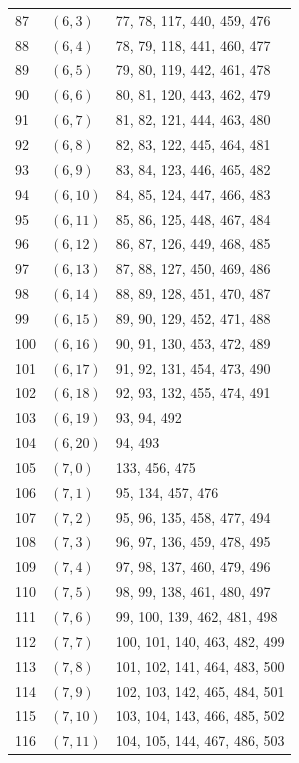 \documentclass{article}
\begin{document}
\begin{longtable}{lll}
  87 & \((6, 3)\) & 77, 78, 117, 440, 459, 476 \\
  88 & \((6, 4)\) & 78, 79, 118, 441, 460, 477 \\
  89 & \((6, 5)\) & 79, 80, 119, 442, 461, 478 \\
  90 & \((6, 6)\) & 80, 81, 120, 443, 462, 479 \\
  91 & \((6, 7)\) & 81, 82, 121, 444, 463, 480 \\
  92 & \((6, 8)\) & 82, 83, 122, 445, 464, 481 \\
  93 & \((6, 9)\) & 83, 84, 123, 446, 465, 482 \\
  94 & \((6, 10)\) & 84, 85, 124, 447, 466, 483 \\
  95 & \((6, 11)\) & 85, 86, 125, 448, 467, 484 \\
  96 & \((6, 12)\) & 86, 87, 126, 449, 468, 485 \\
  97 & \((6, 13)\) & 87, 88, 127, 450, 469, 486 \\
  98 & \((6, 14)\) & 88, 89, 128, 451, 470, 487 \\
  99 & \((6, 15)\) & 89, 90, 129, 452, 471, 488 \\
  100 & \((6, 16)\) & 90, 91, 130, 453, 472, 489 \\
  101 & \((6, 17)\) & 91, 92, 131, 454, 473, 490 \\
  102 & \((6, 18)\) & 92, 93, 132, 455, 474, 491 \\
  103 & \((6, 19)\) & 93, 94, 492 \\
  104 & \((6, 20)\) & 94, 493 \\
  105 & \((7, 0)\) & 133, 456, 475 \\
  106 & \((7, 1)\) & 95, 134, 457, 476 \\
  107 & \((7, 2)\) & 95, 96, 135, 458, 477, 494 \\
  108 & \((7, 3)\) & 96, 97, 136, 459, 478, 495 \\
  109 & \((7, 4)\) & 97, 98, 137, 460, 479, 496 \\
  110 & \((7, 5)\) & 98, 99, 138, 461, 480, 497 \\
  111 & \((7, 6)\) & 99, 100, 139, 462, 481, 498 \\
  112 & \((7, 7)\) & 100, 101, 140, 463, 482, 499 \\
  113 & \((7, 8)\) & 101, 102, 141, 464, 483, 500 \\
  114 & \((7, 9)\) & 102, 103, 142, 465, 484, 501 \\
  115 & \((7, 10)\) & 103, 104, 143, 466, 485, 502 \\
  116 & \((7, 11)\) & 104, 105, 144, 467, 486, 503 \\

\end{longtable}
\end{document}

